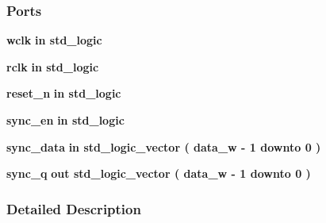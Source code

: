 \subsubsection*{Ports}
 \begin{DoxyCompactItemize}
\item 
{\bf wclk}  {\bfseries {\bfseries \textcolor{keywordflow}{in}\textcolor{vhdlchar}{ }}} {\bfseries \textcolor{comment}{std\+\_\+logic}\textcolor{vhdlchar}{ }} 
\item 
{\bf rclk}  {\bfseries {\bfseries \textcolor{keywordflow}{in}\textcolor{vhdlchar}{ }}} {\bfseries \textcolor{comment}{std\+\_\+logic}\textcolor{vhdlchar}{ }} 
\item 
{\bf reset\+\_\+n}  {\bfseries {\bfseries \textcolor{keywordflow}{in}\textcolor{vhdlchar}{ }}} {\bfseries \textcolor{comment}{std\+\_\+logic}\textcolor{vhdlchar}{ }} 
\item 
{\bf sync\+\_\+en}  {\bfseries {\bfseries \textcolor{keywordflow}{in}\textcolor{vhdlchar}{ }}} {\bfseries \textcolor{comment}{std\+\_\+logic}\textcolor{vhdlchar}{ }} 
\item 
{\bf sync\+\_\+data}  {\bfseries {\bfseries \textcolor{keywordflow}{in}\textcolor{vhdlchar}{ }}} {\bfseries \textcolor{comment}{std\+\_\+logic\+\_\+vector}\textcolor{vhdlchar}{ }\textcolor{vhdlchar}{(}\textcolor{vhdlchar}{ }\textcolor{vhdlchar}{ }\textcolor{vhdlchar}{ }\textcolor{vhdlchar}{ }{\bfseries {\bf data\+\_\+w}} \textcolor{vhdlchar}{-\/}\textcolor{vhdlchar}{ } \textcolor{vhdldigit}{1} \textcolor{vhdlchar}{ }\textcolor{keywordflow}{downto}\textcolor{vhdlchar}{ }\textcolor{vhdlchar}{ } \textcolor{vhdldigit}{0} \textcolor{vhdlchar}{ }\textcolor{vhdlchar}{)}\textcolor{vhdlchar}{ }} 
\item 
{\bf sync\+\_\+q}  {\bfseries {\bfseries \textcolor{keywordflow}{out}\textcolor{vhdlchar}{ }}} {\bfseries \textcolor{comment}{std\+\_\+logic\+\_\+vector}\textcolor{vhdlchar}{ }\textcolor{vhdlchar}{(}\textcolor{vhdlchar}{ }\textcolor{vhdlchar}{ }\textcolor{vhdlchar}{ }\textcolor{vhdlchar}{ }{\bfseries {\bf data\+\_\+w}} \textcolor{vhdlchar}{-\/}\textcolor{vhdlchar}{ } \textcolor{vhdldigit}{1} \textcolor{vhdlchar}{ }\textcolor{keywordflow}{downto}\textcolor{vhdlchar}{ }\textcolor{vhdlchar}{ } \textcolor{vhdldigit}{0} \textcolor{vhdlchar}{ }\textcolor{vhdlchar}{)}\textcolor{vhdlchar}{ }} 
\end{DoxyCompactItemize}


\subsubsection{Detailed Description}


